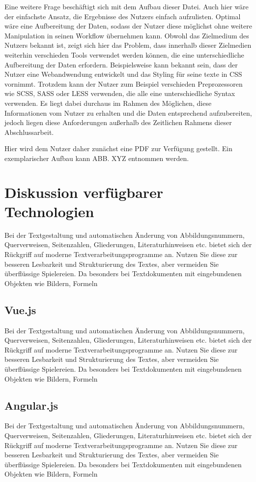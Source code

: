 Eine weitere Frage beschäftigt sich mit dem Aufbau dieser Datei. Auch hier wäre der einfachste Ansatz, die Ergebnisse des Nutzers einfach aufzulisten. Optimal wäre eine Aufbereitung der Daten, sodass der Nutzer diese möglichst ohne weitere Manipulation in seinen Workflow übernehmen kann. Obwohl das Zielmedium des Nutzers bekannt ist, zeigt sich hier das Problem, dass innerhalb dieser Zielmedien weiterhin verschieden Tools verwendet werden können, die eine unterschiedliche Aufbereitung der Daten erfordern.
Beispielsweise kann bekannt sein, dass der Nutzer eine Webandwendung entwickelt und das Styling für seine texte in CSS vornimmt. Trotzdem kann der Nutzer zum Beispiel verschieden Preprozessoren wie SCSS, SASS oder LESS verwenden, die alle eine unterschiedliche Syntax verwenden.
Es liegt dabei durchaus im Rahmen des Möglichen, diese Informationen vom Nutzer zu erhalten und die Daten entsprechend aufzubereiten, jedoch liegen diese Anforderungen außerhalb des Zeitlichen Rahmens dieser Abschlussarbeit.

Hier wird dem Nutzer daher zunächst eine PDF zur Verfügung gestellt. Ein exemplarischer Aufbau kann ABB. XYZ entnommen werden.

\section{Diskussion verfügbarer Technologien}
Bei der Textgestaltung und automatischen Änderung von Abbildungsnummern, Querverweisen,
Seitenzahlen, Gliederungen, Literaturhinweisen etc. bietet sich der Rückgriff
auf moderne Textverarbeitungsprogramme an. Nutzen Sie diese zur besseren Lesbarkeit
und Strukturierung des Textes, aber vermeiden Sie überflüssige Spielereien. Da
besonders bei Textdokumenten mit eingebundenen Objekten wie Bildern, Formeln

\subsection{Vue.js}
Bei der Textgestaltung und automatischen Änderung von Abbildungsnummern, Querverweisen,
Seitenzahlen, Gliederungen, Literaturhinweisen etc. bietet sich der Rückgriff
auf moderne Textverarbeitungsprogramme an. Nutzen Sie diese zur besseren Lesbarkeit
und Strukturierung des Textes, aber vermeiden Sie überflüssige Spielereien. Da
besonders bei Textdokumenten mit eingebundenen Objekten wie Bildern, Formeln

\subsection{Angular.js}
Bei der Textgestaltung und automatischen Änderung von Abbildungsnummern, Querverweisen,
Seitenzahlen, Gliederungen, Literaturhinweisen etc. bietet sich der Rückgriff
auf moderne Textverarbeitungsprogramme an. Nutzen Sie diese zur besseren Lesbarkeit
und Strukturierung des Textes, aber vermeiden Sie überflüssige Spielereien. Da
besonders bei Textdokumenten mit eingebundenen Objekten wie Bildern, Formeln

